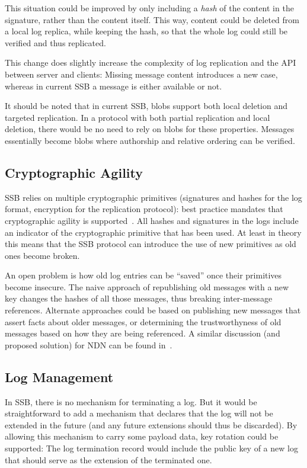 \documentclass[10pt,sigconf,rewiew]{acmart}
\begin{document}
This situation could be improved by only including a {\em hash} of the content in the signature, rather than the content itself. This way, content could be deleted from a local log replica, while keeping the hash, so that the whole log could still be verified and thus replicated.

This change does slightly increase the complexity of log replication and the API between server and clients: Missing message content introduces a new case, whereas in current SSB a message is either available or not.

It should be noted that in current SSB, blobs support both local deletion and targeted replication. In a protocol with both partial replication and local deletion, there would be no need to rely on blobs for these properties. Messages essentially become blobs where authorship and relative ordering can be verified.

\subsection{Cryptographic Agility}

SSB relies on multiple cryptographic primitives (signatures and hashes for the log format, encryption for the replication protocol): best practice mandates that cryptographic agility is supported~\cite{nelson2011crypto}. All hashes and signatures in the logs include an indicator of the cryptographic primitive that has been used. At least in theory this means that the SSB protocol can introduce the use of new primitives as old ones become broken.

An open problem is how old log entries can be ``saved'' once their primitives become insecure. The naive approach of republishing old messages with a new key changes the hashes of all those messages, thus breaking inter-message references.
Alternate approaches could be based on publishing new messages that assert facts about older messages, or determining the trustworthyness of old messages based on how they are being referenced.
A similar discussion (and proposed solution) for NDN can be found in~\cite{DeLorean}.

\subsection{Log Management}

In SSB, there is no mechanism for terminating a log. But it would be straightforward to add a mechanism that declares that the log will not be extended in the future (and any future extensions should thus be discarded). By allowing this mechanism to carry some payload data, key rotation could be supported: The log termination record would include the public key of a new log that should serve as the extension of the terminated one.
\end{document}
